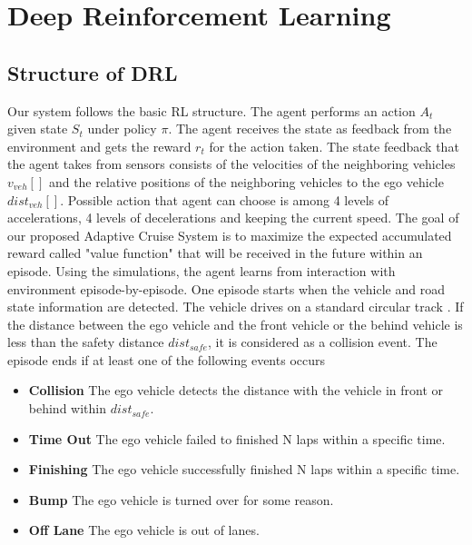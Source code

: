 \chapter{Deep Reinforcement Learning}

\section{Structure of DRL}

Our system follows the basic RL structure. The agent performs an action $A_t$ given state $S_t$ under policy $\pi$. The agent receives the state as feedback from the environment and gets the reward $r_t$ for the action taken. The state feedback that the agent takes from sensors consists of the velocities of the neighboring vehicles $v_{veh}[]$ and the relative positions of the neighboring vehicles to the ego vehicle $dist_{veh}[]$. Possible action that agent can choose is among 4 levels of accelerations, 4 levels of decelerations and keeping the current speed. The goal of our proposed Adaptive Cruise System is to maximize the expected accumulated reward called "value function" that will be received in the future within an episode. Using the simulations, the agent learns from interaction with environment episode-by-episode. One episode starts when the vehicle and road state information are detected. The vehicle drives on a standard circular track . If the distance between the ego vehicle and the front vehicle or the behind vehicle is less than the safety distance $dist_{safe}$, it is considered as a collision event. The episode ends if at least one of the following events occurs

\begin{itemize}

\item \textbf{Collision} The ego vehicle detects the distance with the vehicle in front or behind within $dist_{safe}$.

\item \textbf{Time Out} The ego vehicle failed to finished N laps within a specific time.

\item \textbf{Finishing} The ego vehicle successfully finished N laps within a specific time.

\item \textbf{Bump} The ego vehicle is turned over for some reason.

\item \textbf{Off Lane} The ego vehicle is out of lanes.

\end{itemize}

